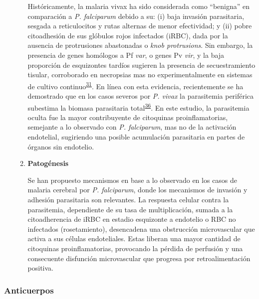 \documentclass[]{article}
\begin{document}
\begin{enumerate}
\begin{enumerate}
    Históricamente, la malaria vivax ha sido considerada como
    ``benigna'' en comparación a \emph{P. falciparum} debido a su: (i)
    baja invasión parasitaria, sesgada a reticulocitos y rutas alternas
    de menor efectividad; y (ii) pobre citoadhesión de sus glóbulos
    rojos infectados (iRBC), dada por la ausencia de protrusiones
    abastonadas o \emph{knob protrusions}. Sin embargo, la presencia de
    genes homólogos a Pf \emph{var}, o genes Pv \emph{vir}, y la baja
    proporción de esquizontes tardíos sugieren la presencia de
    secuestramiento tisular, corroborado en necropsias mas no
    experimentalmente en sistemas de cultivo
    continuo\textsuperscript{\protect\hyperlink{ref-wassmer2015}{31}}.
    En línea con esta evidencia, recientemente se ha demostrado que en
    los casos severos por \emph{P. vivax} la parasitemia periférica
    subestima la biomasa parasitaria
    total\textsuperscript{\protect\hyperlink{ref-barber2015}{36}}. En
    este estudio, la parasitemia oculta fue la mayor contribuyente de
    citoquinas proinflamatorias, semejante a lo observado con \emph{P.
    falciparum}, mas no de la activación endotelial, sugiriendo una
    posible acumulación parasitaria en partes de órganos sin endotelio.
  \item
    \textbf{Patogénesis}

    Se han propuesto mecanismos en base a lo observado en los casos de
    malaria cerebral por \emph{P. falciparum}, donde los mecanismos de
    invasión y adhesión parasitaria son relevantes. La respuesta celular
    contra la parasitemia, dependiente de su tasa de multiplicación,
    sumada a la citoadherencia de iRBC en estadio esquizonte a endotelio
    o RBC no infectados (rosetamiento), desencadena una obstrucción
    microvascular que activa a sus células endoteliales. Estas liberan
    una mayor cantidad de citoquinas proinflamatorias, provocando la
    pérdida de perfusión y una consecuente disfunción microvascular que
    progresa por retroalimentación positiva.
  \end{enumerate}
\end{enumerate}

\subsubsection{Anticuerpos}\label{anticuerpos}
\end{document}
